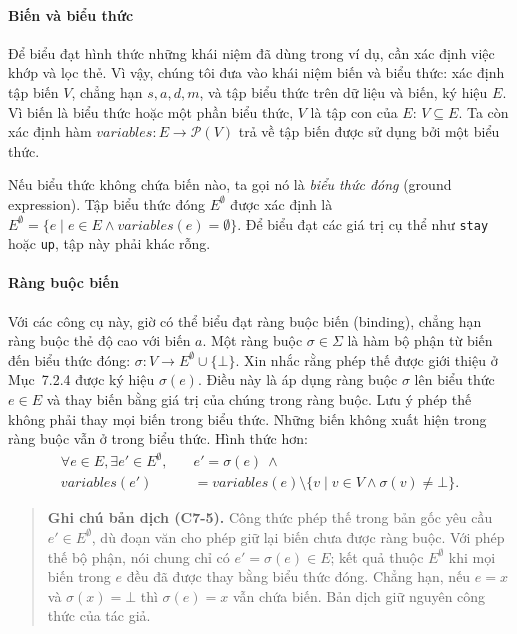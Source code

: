 \paragraph{Biến và biểu thức}
Để biểu đạt hình thức những khái niệm đã dùng trong ví dụ, cần xác định việc khớp và lọc thẻ. Vì vậy, chúng tôi đưa vào khái niệm biến và biểu thức: xác định tập biến $V$, chẳng hạn $s,a,d,m$, và tập biểu thức trên dữ liệu và biến, ký hiệu $E$.
Vì biến là biểu thức hoặc một phần biểu thức, $V$ là tập con của $E$: $V\subseteq E$. Ta còn xác định hàm $variables:E\to\mathcal{P}(V)$ trả về tập biến được sử dụng bởi một biểu thức.

Nếu biểu thức không chứa biến nào, ta gọi nó là \emph{biểu thức đóng} (ground expression). Tập biểu thức đóng $E^{\emptyset}$ được xác định là $E^{\emptyset}=\{e\mid e\in E\land variables(e)=\emptyset\}$. Để biểu đạt các giá trị cụ thể như \texttt{stay} hoặc \texttt{up}, tập này phải khác rỗng.

\paragraph{Ràng buộc biến}
Với các công cụ này, giờ có thể biểu đạt ràng buộc biến (binding), chẳng hạn ràng buộc thẻ độ cao với biến $a$. Một ràng buộc $\sigma\in\Sigma$ là hàm bộ phận từ biến đến biểu thức đóng: $\sigma:V\to E^{\emptyset}\cup\{\bot\}$. Xin nhắc rằng phép thế được giới thiệu ở Mục~7.2.4 được ký hiệu $\sigma(e)$. Điều này là áp dụng ràng buộc $\sigma$ lên biểu thức $e\in E$ và thay biến bằng giá trị của chúng trong ràng buộc. Lưu ý phép thế không phải thay mọi biến trong biểu thức. Những biến không xuất hiện trong ràng buộc vẫn ở trong biểu thức. Hình thức hơn:
\[
\begin{aligned}
\forall e\in E,\exists e'\in E^{\emptyset},\quad &e'=\sigma(e)\ \land\\
variables(e')&=variables(e)\setminus\{v\mid v\in V\land\sigma(v)\neq\bot\}.
\end{aligned}
\]
\begin{quote}
\small\textbf{Ghi chú bản dịch (C7-5).} Công thức phép thế trong bản gốc yêu cầu $e'\in E^{\emptyset}$, dù đoạn văn cho phép giữ lại biến chưa được ràng buộc. Với phép thế bộ phận, nói chung chỉ có $e'=\sigma(e)\in E$; kết quả thuộc $E^{\emptyset}$ khi mọi biến trong $e$ đều đã được thay bằng biểu thức đóng. Chẳng hạn, nếu $e=x$ và $\sigma(x)=\bot$ thì $\sigma(e)=x$ vẫn chứa biến. Bản dịch giữ nguyên công thức của tác giả.
\end{quote}


